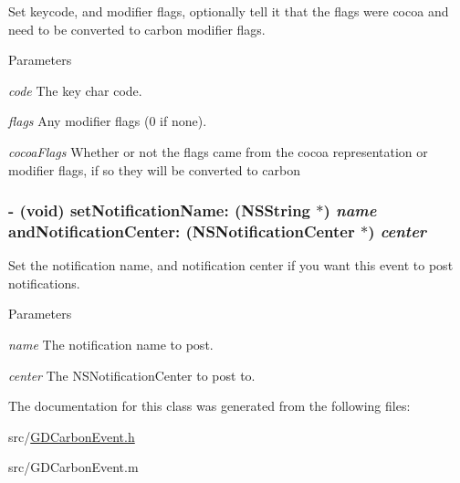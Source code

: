 Set keycode, and modifier flags, optionally tell it that the flags were cocoa and need to be converted to carbon modifier flags. 
\begin{DoxyParams}{Parameters}
\item[{\em code}]The key char code. \item[{\em flags}]Any modifier flags (0 if none). \item[{\em cocoaFlags}]Whether or not the flags came from the cocoa representation or modifier flags, if so they will be converted to carbon \end{DoxyParams}
\hypertarget{interface_g_d_carbon_event_a33e3feb0ec56180d02e170e8bf213b6c}{
\subsubsection[{setNotificationName:andNotificationCenter:}]{\setlength{\rightskip}{0pt plus 5cm}-\/ (void) setNotificationName: (NSString $\ast$) {\em name}\/ andNotificationCenter: (NSNotificationCenter $\ast$) {\em center}}}
\label{interface_g_d_carbon_event_a33e3feb0ec56180d02e170e8bf213b6c}


Set the notification name, and notification center if you want this event to post notifications. 
\begin{DoxyParams}{Parameters}
\item[{\em name}]The notification name to post. \item[{\em center}]The NSNotificationCenter to post to. \end{DoxyParams}


The documentation for this class was generated from the following files:\begin{DoxyCompactItemize}
\item 
src/\hyperlink{_g_d_carbon_event_8h}{GDCarbonEvent.h}\item 
src/GDCarbonEvent.m\end{DoxyCompactItemize}
